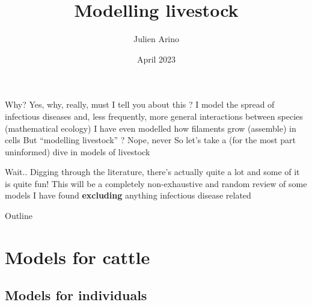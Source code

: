 \documentclass[aspectratio=43]{beamer}
\title{Modelling livestock}
\author{Julien Arino}
\date{April 2023}
\begin{document}

\begin{frame}
  \titlepage
\end{frame}
\addtocounter{page}{-1}





\begin{frame}{Why?}
    Yes, why, really, must I tell you about this ?
    \vfill
    I model the spread of infectious diseases and, less frequently, more general interactions between species (mathematical ecology)
    \vfill
    I have even modelled how filaments grow (assemble) in cells
    \vfill
    But ``modelling livestock'' ? Nope, never
    \vfill
    So let's take a (for the most part uninformed) dive in models of livestock
\end{frame}

\begin{frame}{Wait..}
    Digging through the literature, there's actually quite a lot and some of it is quite fun!
    \vfill
    This will be a completely non-exhaustive and random review of some models I have found \textbf{excluding} anything infectious disease related
\end{frame}

\begin{frame}{Outline}
    \tableofcontents[hideallsubsections]
\end{frame}

\section{Models for cattle}

\subsection{Models for individuals}
\end{document}
